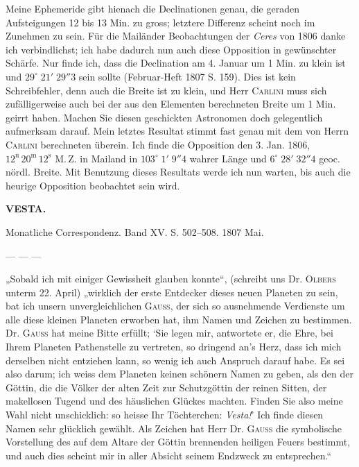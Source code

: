 \par\indent Meine Ephemeride gibt hienach die Declinationen genau, die geraden Aufsteigungen 12 bis 13
Min. zu gross; letztere Differenz scheint noch im Zunehmen zu sein. Für die Mailänder Beobachtungen
der \emph{Ceres} von 1806 danke ich verbindlichst; ich habe dadurch nun auch diese Opposition in gewünschter Schärfe. Nur finde ich, dass die Declination am 4. Januar um 1 Min. zu klein ist und $29^\circ\;21'\;29''3$
sein sollte (Februar-Heft 1807 S. 159). Dies ist kein Schreibfehler, denn auch die Breite ist zu klein,
und Herr \textsc{Carlini} muss sich zufälligerweise auch bei der aus den Elementen berechneten Breite um
1 Min. geirrt haben. Machen Sie diesen geschickten Astronomen doch gelegentlich aufmerksam darauf.
Mein letztes Resultat stimmt fast genau mit dem von Herrn \textsc{Carlini} berechneten überein. Ich finde die
Opposition den 3. Jan. 1806, $12^{\mathrm u}\,20^{\mathrm m}\,12^{\mathrm s}$ M.\,Z. in Mailand in $103^\circ\;1'\;9''4$ wahrer Länge und
$6^\circ\;28'\;32''4$ geoc. nördl. Breite. Mit Benutzung dieses Resultats werde ich nun warten, bis auch die
heurige Opposition beobachtet sein wird.

\clearpage{}
\begin{center}
\textbf{VESTA.}

\hrulefill

Monatliche Correspondenz. Band XV. S. 502–508. 1807 Mai.

\hrulefill
\end{center}

--- --- ---

\par\indent „Sobald ich mit einiger Gewissheit glauben konnte“, (schreibt uns Dr. \textsc{Olbers} unterm 22. April)
„wirklich der erste Entdecker dieses neuen Planeten zu sein, bat ich unsern unvergleichlichen \textsc{Gauss},
der sich so ausnehmende Verdienste um alle diese kleinen Planeten erworben hat, ihm Namen und
Zeichen zu bestimmen. Dr. \textsc{Gauss} hat meine Bitte erfüllt; `Sie legen mir, antwortete er, die Ehre, bei
Ihrem Planeten Pathenstelle zu vertreten, so dringend an's Herz, dass ich mich derselben nicht entziehen kann, so wenig ich auch Anspruch darauf habe. Es sei also darum; ich weiss dem Planeten keinen schönern Namen zu geben, als den der Göttin, die die Völker der alten Zeit zur Schutzgöttin der
reinen Sitten, der makellosen Tugend und des häuslichen Glückes machten. Finden Sie also meine
Wahl nicht unschicklich: so heisse Ihr Töchterchen: \emph{Vesta!}' Ich finde diesen Namen sehr glücklich
gewählt. Als Zeichen hat Herr Dr. \textsc{Gauss} die symbolische Vorstellung des auf dem Altare der Göttin
brennenden heiligen Feuers \VestaAltarBody{} bestimmt, und auch dies scheint mir in aller Absicht seinem Endzweck
zu entsprechen.“

